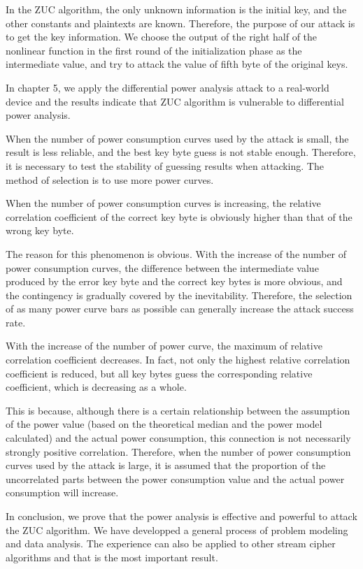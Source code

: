 \begin{bigabstract}
In the ZUC algorithm, the only unknown information is the initial key, and the other constants and plaintexts are known. Therefore, the purpose of our attack is to get the key information. We choose the output of the right half of the nonlinear function in the first round of the initialization phase as the intermediate value, and try to attack the value of fifth byte of the original keys.

In chapter 5, we apply the differential power analysis attack to a real-world device and the results indicate that ZUC algorithm is vulnerable to differential power analysis.

When the number of power consumption curves used by the attack is small, the result is less reliable, and the best key byte guess is not stable enough. Therefore, it is necessary to test the stability of guessing results when attacking. The method of selection is to use more power curves.

When the number of power consumption curves is increasing, the relative correlation coefficient of the correct key byte is obviously higher than that of the wrong key byte.

The reason for this phenomenon is obvious. With the increase of the number of power consumption curves, the difference between the intermediate value produced by the error key byte and the correct key bytes is more obvious, and the contingency is gradually covered by the inevitability. Therefore, the selection of as many power curve bars as possible can generally increase the attack success rate.

With the increase of the number of power curve, the maximum of relative correlation coefficient decreases. In fact, not only the highest relative correlation coefficient is reduced, but all key bytes guess the corresponding relative coefficient, which is decreasing as a whole. 

This is because, although there is a certain relationship between the assumption of the power value (based on the theoretical median and the power model calculated) and the actual power consumption, this connection is not necessarily strongly positive correlation. Therefore, when the number of power consumption curves used by the attack is large, it is assumed that the proportion of the uncorrelated parts between the power consumption value and the actual power consumption will increase.

In conclusion, we prove that the power analysis is effective and powerful to attack the ZUC algorithm. We have developped a general process of problem modeling and data analysis. The experience can also be applied to other stream cipher algorithms and that is the most important result.

\end{bigabstract}